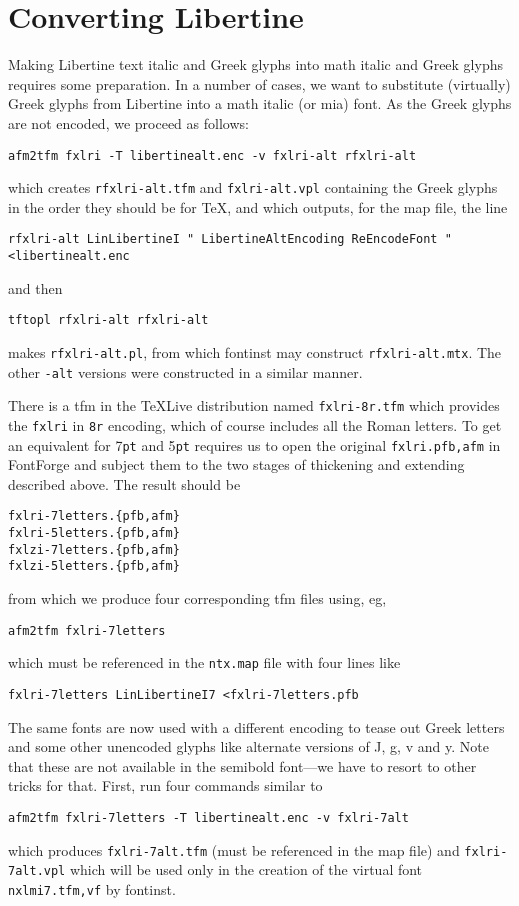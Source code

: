 \documentclass[10pt]{amsart}
\begin{document}
\section{Converting Libertine}
Making Libertine text italic and Greek glyphs into math italic and Greek glyphs requires some preparation. In a number of cases, we want to substitute (virtually) Greek glyphs from Libertine into a math italic (or mia) font. As the Greek glyphs are not encoded, we proceed as follows:
\begin{verbatim}
afm2tfm fxlri -T libertinealt.enc -v fxlri-alt rfxlri-alt
\end{verbatim}
which creates {\tt rfxlri-alt.tfm} and {\tt fxlri-alt.vpl} containing the Greek glyphs in the order they should be for \TeX, and which outputs, for the map file, the line
\begin{verbatim}
rfxlri-alt LinLibertineI " LibertineAltEncoding ReEncodeFont " <libertinealt.enc
\end{verbatim}
and then
\begin{verbatim}
tftopl rfxlri-alt rfxlri-alt
\end{verbatim}
makes {\tt rfxlri-alt.pl}, from which \textsf{fontinst} may construct {\tt rfxlri-alt.mtx}. The other {\tt -alt} versions were constructed in a similar manner.

There is a tfm in the \TeX Live distribution named {\tt fxlri-8r.tfm} which provides the {\tt fxlri} in {\tt 8r} encoding, which of course includes all the Roman letters. To get an equivalent for 7{\tt pt} and 5{\tt pt} requires us to open the original {\tt fxlri.{pfb,afm}} in FontForge and subject them to the two stages of thickening and extending described above. The result should be 
\begin{verbatim}
fxlri-7letters.{pfb,afm}
fxlri-5letters.{pfb,afm}
fxlzi-7letters.{pfb,afm}
fxlzi-5letters.{pfb,afm}
\end{verbatim}
from which we produce four corresponding tfm files using, eg, 
\begin{verbatim}
afm2tfm fxlri-7letters
\end{verbatim}
which must be referenced in the {\tt ntx.map} file with four lines like
\begin{verbatim}
fxlri-7letters LinLibertineI7 <fxlri-7letters.pfb
\end{verbatim}
The same fonts are now used with a different encoding to tease out Greek letters and some other unencoded glyphs like alternate versions of J, g, v and y. Note that these are not available in the semibold font---we have to resort to other tricks for that. First, run four commands similar to
\begin{verbatim}
afm2tfm fxlri-7letters -T libertinealt.enc -v fxlri-7alt
\end{verbatim}
which produces {\tt fxlri-7alt.tfm} (must be referenced in the map file) and {\tt fxlri-7alt.vpl} which will be used only in the creation of the virtual font {\tt nxlmi7.{tfm,vf}} by \textsf{fontinst}. 
\end{document}
